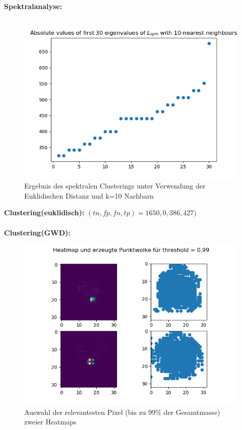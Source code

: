 \documentclass[11pt,a4paper]{article}
\numberwithin{equation}{section}
\begin{document}
	\newpage
	\noindent \textbf{Spektralanalyse:}
	\begin{figure}[h]
		\begin{center}
			\includegraphics[width=0.5\textheight]{specClustering_l2_k10.png}
			\caption{Ergebnis des spektralen Clusterings unter Verwendung der Euklidischen Distanz und k=10 Nachbarn}
		\end{center}
	\end{figure}
	
	\noindent \textbf{Clustering(euklidisch):}
	$(tn, fp, fn, tp) = 1650, 0, 386, 427)$\\
	\\
	\noindent \textbf{Clustering(GWD):}
	\begin{figure}[h]
		\begin{center}
			\includegraphics[width=0.5\textheight]{HeatmapPunktwolke99.png}
			\caption{Auswahl der relevantesten Pixel (bis zu $99\%$ der Gesamtmasse) zweier Heatmaps}
		\end{center}
	\end{figure}
	
\end{document}
